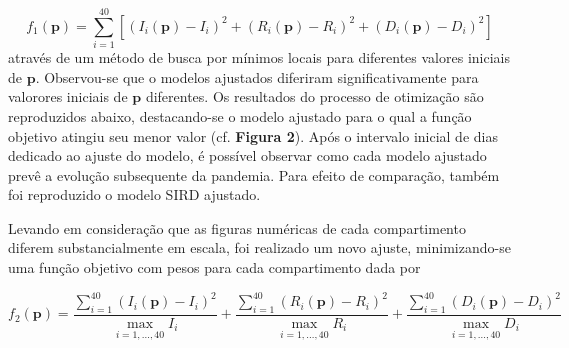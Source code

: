 \documentclass[a4paper,12pt]{article}
\begin{document}
$$ f_1(\mathbf{p}) = \sum\limits_{i=1}^{40} \left[(I_i(\mathbf{p})- I_i)^2 + (R_i(\mathbf{p})-R_i)^2 + (D_i(\mathbf{p})-D_i)^2\right] $$
através de um método de busca por mínimos locais para diferentes valores iniciais de $\mathbf{p}$. Observou-se que o modelos ajustados diferiram significativamente para valorores iniciais de $\mathbf{p}$ diferentes. Os resultados do processo de otimização são reproduzidos abaixo, destacando-se o modelo ajustado para o qual a função objetivo atingiu seu menor valor (cf. \textbf{Figura 2}). Após o intervalo inicial de dias dedicado ao ajuste do modelo, é possível observar como cada modelo ajustado prevê a evolução subsequente da pandemia. Para efeito de comparação, também foi reproduzido o modelo SIRD ajustado.

Levando em consideração que as figuras numéricas de cada compartimento diferem substancialmente em escala, foi realizado um novo ajuste, minimizando-se uma função objetivo com pesos para cada compartimento dada por

$$ f_2(\mathbf{p}) = \frac{\sum\limits_{i=1}^{40} (I_i(\mathbf{p})- I_i)^2}{\max\limits_{i=1,\dots,40} I_i} + \frac{\sum\limits_{i=1}^{40} (R_i(\mathbf{p})- R_i)^2}{\max\limits_{i=1,\dots,40} R_i} + \frac{\sum\limits_{i=1}^{40} (D_i(\mathbf{p})- D_i)^2}{\max\limits_{i=1,\dots,40} D_i} $$
\end{document}
